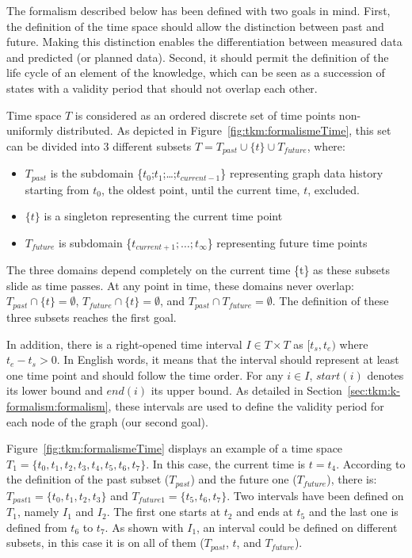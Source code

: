 The formalism described below has been defined with two goals in mind.
First, the definition of the time space should allow the distinction between past and future. 
Making this distinction enables the differentiation between measured data and predicted (or planned data).
Second, it should permit the definition of the life cycle of an element of the \gls{knowledge}, which can be seen as a succession of states with a validity period that should not overlap each other.

Time space $T$ is considered as an ordered discrete set of time points non-uniformly distributed. 
As depicted in Figure~\ref{fig:tkm:formalismeTime}, this set can be divided into 3 different subsets $T = T_{past} \cup \{t\} \cup T_{future}$, where:   \begin{itemize}  \item $T_{past}$ is the subdomain \{$t_{0}$;$t_{1}$;\ldots;$t_{current-1}$\}  representing graph data history starting from $t_0$, the oldest point, until the current time, $t$, excluded.

\item $\{t\}$ is a singleton representing the current time  point  \item $T_{future}$ is subdomain \{$t_{current+1};\ldots;t_{\infty}$\} representing future time points  \end{itemize}
The three domains depend completely on the current time \{t\} as these subsets slide as time passes. 
At any point in time, these domains never overlap: $T_{past} \cap \{t\} = \emptyset$, $T_{future} \cap \{t\} =  \emptyset$, and $T_{past} \cap T_{future} = \emptyset$.
The definition of these three subsets reaches the first goal.

In addition, there is a right-opened time interval $I \in T \times T$ as $[t_s, t_e)$ where $t_e - t_s > 0$.
In English words, it means that the interval should represent at least one time point and should follow the time order. 
For any $i \in I$, $start(i)$ denotes its lower bound and $end(i)$ its upper bound.
As detailed in Section~\ref{sec:tkm:k-formalism:formalism}, these intervals are used to define the validity period for each node of the graph (our second goal).

Figure~\ref{fig:tkm:formalismeTime} displays an example of a time space $T_1 = \{t_0, t_1, t_2, t_3, t_4, t_5, t_6, t_7\}$.
In this case, the current time is $t = t_4$.
According to the definition of the past subset ($T_{past}$) and the future one ($T_{future}$), there is: $T_{past1} =  \{t_0, t_1, t_2, t_3\}$ and $T_{future1} = \{t_5, t_6, t_7\}$.
Two intervals have been defined on $T_1$, namely $I_1$ and $I_2$.
The first one starts at $t_2$ and ends at $t_5$ and the last one is defined from $t_6$ to $t_7$.
As shown with $I_1$, an interval could be defined on different subsets, in this case it is on all of them ($T_{past}$, $t$, and $T_{future}$).

